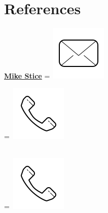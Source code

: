 \documentclass[]{latex/resume}
\begin{document}
\begin{minipage}[t]{0.25\textwidth}


    \sectionsep


\section{References}

    \href{}{\textbf{Mike Stice}} 
    \begingroup
        =\hbox{ \includegraphics[scale=0.1,trim={0 1cm 0cm 0cm}]{latex/icons/mail.png}\hspace{0.1cm}  }
        \parbox{\wd0}{}
    \endgroup
    
    \begingroup
        =\hbox{
        \includegraphics[scale=0.1,trim={0 1.25cm -0.4cm 0cm}]{latex/icons/phone.png}\hspace{0.3cm}
        }
        \parbox{\wd0}{}
    \endgroup \\
    \begingroup
        =\hbox{
        \includegraphics[scale=0.1,trim={0 1.25cm -0.4cm 0cm}]{latex/icons/phone.png}\hspace{0.3cm}
        }
        \parbox{\wd0}{}
    \endgroup \\ 


\end{minipage}
\end{document}
